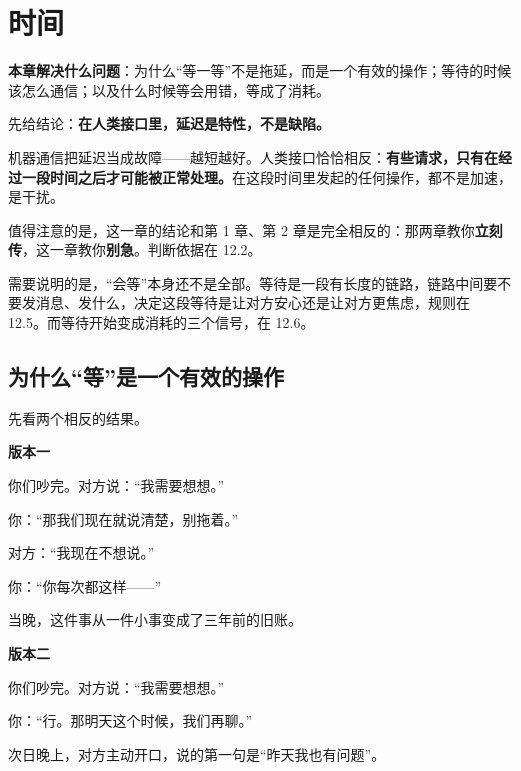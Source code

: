 \chapter{时间}


\begin{guideblock}
\textbf{本章解决什么问题}：为什么“等一等”不是拖延，而是一个有效的操作；等待的时候该怎么通信；以及什么时候等会用错，等成了消耗。
\end{guideblock}

先给结论：\textbf{在人类接口里，延迟是特性，不是缺陷。}

机器通信把延迟当成故障——越短越好。人类接口恰恰相反：\textbf{有些请求，只有在经过一段时间之后才可能被正常处理。}在这段时间里发起的任何操作，都不是加速，是干扰。

值得注意的是，这一章的结论和第 1 章、第 2 章是完全相反的：那两章教你\textbf{立刻传}，这一章教你\textbf{别急}。判断依据在 12.2。

需要说明的是，“会等”本身还不是全部。等待是一段有长度的链路，链路中间要不要发消息、发什么，决定这段等待是让对方安心还是让对方更焦虑，规则在 12.5。而等待开始变成消耗的三个信号，在 12.6。

\hcirule

\section{为什么“等”是一个有效的操作}

先看两个相反的结果。

\begin{mdquote}


\vspace{0.3\baselineskip}

\textbf{版本一}\par
你们吵完。对方说：“我需要想想。”\par
你：“那我们现在就说清楚，别拖着。”\par
对方：“我现在不想说。”\par
你：“你每次都这样——”\par
当晚，这件事从一件小事变成了三年前的旧账。

\vspace{0.4\baselineskip}

\textbf{版本二}\par
你们吵完。对方说：“我需要想想。”\par
你：“行。那明天这个时候，我们再聊。”\par
次日晚上，对方主动开口，说的第一句是“昨天我也有问题”。
\end{mdquote}

